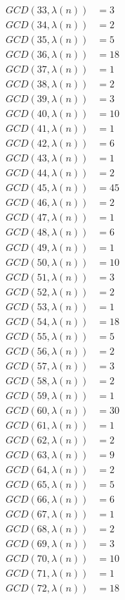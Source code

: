 \documentclass[uplatex]{jsarticle}
\begin{document}
\begin{align*}
GCD(33, \lambda(n))&= 3\\
GCD(34, \lambda(n))&= 2\\
GCD(35, \lambda(n))&= 5\\
GCD(36, \lambda(n))&= 18\\
GCD(37, \lambda(n))&= 1\\
GCD(38, \lambda(n))&= 2\\
GCD(39, \lambda(n))&= 3\\
GCD(40, \lambda(n))&= 10\\
GCD(41, \lambda(n))&= 1\\
GCD(42, \lambda(n))&= 6\\
GCD(43, \lambda(n))&= 1\\
GCD(44, \lambda(n))&= 2\\
GCD(45, \lambda(n))&= 45\\
GCD(46, \lambda(n))&= 2\\
GCD(47, \lambda(n))&= 1\\
GCD(48, \lambda(n))&= 6\\
GCD(49, \lambda(n))&= 1\\
GCD(50, \lambda(n))&= 10\\
GCD(51, \lambda(n))&= 3\\
GCD(52, \lambda(n))&= 2\\
GCD(53, \lambda(n))&= 1\\
GCD(54, \lambda(n))&= 18\\
GCD(55, \lambda(n))&= 5\\
GCD(56, \lambda(n))&= 2\\
GCD(57, \lambda(n))&= 3\\
GCD(58, \lambda(n))&= 2\\
GCD(59, \lambda(n))&= 1\\
GCD(60, \lambda(n))&= 30\\
GCD(61, \lambda(n))&= 1\\
GCD(62, \lambda(n))&= 2\\
GCD(63, \lambda(n))&= 9\\
GCD(64, \lambda(n))&= 2\\
GCD(65, \lambda(n))&= 5\\
GCD(66, \lambda(n))&= 6\\
GCD(67, \lambda(n))&= 1\\
GCD(68, \lambda(n))&= 2\\
GCD(69, \lambda(n))&= 3\\
GCD(70, \lambda(n))&= 10\\
GCD(71, \lambda(n))&= 1\\
GCD(72, \lambda(n))&= 18\\

\end{align*}
\end{document}
